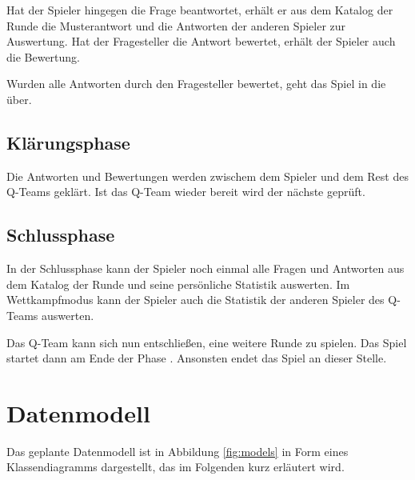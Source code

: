 \documentclass[a4paper,11pt,listof=numbered,glossary=totoc,parskip=half,toc=bib]{scrreprt}
\begin{document}
	Hat der Spieler hingegen die Frage beantwortet, erhält er aus dem Katalog der Runde die Musterantwort und die Antworten der anderen Spieler zur Auswertung. Hat der Fragesteller die Antwort bewertet, erhält der Spieler auch die Bewertung.
	
	Wurden alle Antworten durch den Fragesteller bewertet, geht das Spiel in die  über.
	
	\subsection{Klärungsphase}
	\label{subsec:klaerungsphase}
	Die Antworten und Bewertungen werden zwischem dem Spieler und dem Rest des Q-Teams geklärt. Ist das Q-Team wieder bereit wird der nächste  geprüft.
	
	\subsection{Schlussphase}
	\label{subsec:schlussphase}
	In der Schlussphase kann der Spieler noch einmal alle Fragen und Antworten aus dem Katalog der Runde  und seine persönliche Statistik auswerten. Im Wettkampfmodus kann der Spieler auch die Statistik der anderen Spieler des Q-Teams auswerten.
	
	Das Q-Team kann sich nun entschließen, eine weitere Runde zu spielen. Das Spiel startet dann am Ende der Phase . Ansonsten endet das Spiel an dieser Stelle.
	 
	
	\section{Datenmodell}
	
	Das geplante Datenmodell ist in Abbildung \ref{fig:models} in Form eines Klassendiagramms dargestellt, das im Folgenden kurz erläutert wird.
	
\end{document}

